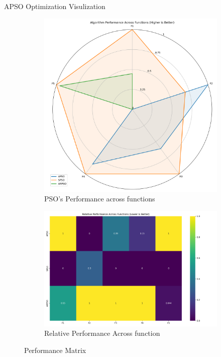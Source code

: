 \documentclass[aspectratio=169]{beamer}
\begin{document}
\begin{frame}{APSO Optimization Visulization}
    \centering
    \begin{figure}
        \centering
        \begin{subfigure}[b]{0.20\textwidth}
            \includegraphics[width=\textwidth]{../plots/cec_bench/radar_chart.png}
            \caption*{PSO's Performance across functions}
        \end{subfigure}
        \begin{subfigure}[b]{0.34\textwidth}
            \includegraphics[width=\textwidth]{../plots/cec_bench/performance_heatmap.png}
            \caption*{Relative Performance Across function}
        \end{subfigure}
        \vspace{-1ex}
        \caption*{\scriptsize Performance Matrix}
    \end{figure}
    

\end{frame}
\end{document}

